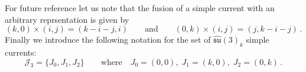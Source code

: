 \documentclass[a4paper,11pt]{article}
\theoremstyle{plain}
\theoremstyle{definition}
\newcommand{\mycomment}[1]{}
\newcommand{\aff}{\widehat{\mathfrak{su}}(3)_k}
\begin{document}
For future reference let us note that the fusion of a simple current with an arbitrary reprsentation is given by
\begin{equation}\label{currentaction}
    (k,0)\times (i,j) =(k-i-j,i) \qquad \text{and} \qquad (0,k)\times (i,j) = (j,k-i-j)\,.
\end{equation}
Finally we introduce the following notation for the set of $\widehat{\mathfrak{su}}(3)_k$ simple currents: 
\begin{equation}
    \mathcal{J}_3=\{J_0,J_1,J_2\} \qquad\text{where} \quad J_0=(0,0),\; J_1=(k,0),\; J_2=(0,k)\,.
\end{equation}

\mycomment{
as well as the fusion action of the simple currents on a set containing $\aff$ representations $\mathcal{S}=\{s_1,s_2,\ldots,s_l\}$:
\begin{equation}
    \mathcal{J}\cdot \mathcal{S}:= \{J_m\times s_n\,|\, m=0,1,2,\; n=1,2,\ldots,l\}
\end{equation}
}
\end{document}
